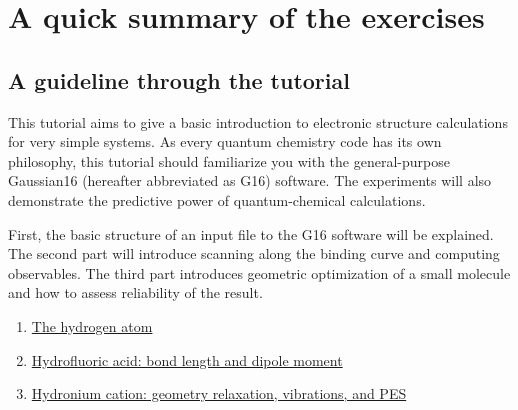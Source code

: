 \section{A quick summary of the exercises}

\subsection{A guideline through the tutorial}
This tutorial aims to give a basic introduction to electronic structure calculations for very simple systems. 
As every quantum chemistry code has its own philosophy, this tutorial should familiarize you with the general-purpose Gaussian16 (hereafter abbreviated as G16) software.
The experiments will also demonstrate the predictive power of quantum-chemical calculations. 	
	
First, the basic structure of an input file to the G16 software will be explained.
The second part will introduce scanning along the binding curve and computing observables. 
The third part introduces geometric optimization of a small molecule and how to assess reliability of the result. 


\begin{enumerate}[
    label=Prob. \Roman*:,
    align=left,
    leftmargin=*,
    itemindent=\parsep
  ]
  \item \hyperref[sec:problemI]{The hydrogen atom}
  \item \hyperref[sec:problemII]{Hydrofluoric acid: bond length and dipole moment}	      
  \item \hyperref[sec:problemIII]{Hydronium cation: geometry relaxation, vibrations, and PES}
\end{enumerate}




